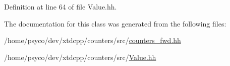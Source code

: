 Definition at line 64 of file Value.\+hh.



The documentation for this class was generated from the following files\+:\begin{DoxyCompactItemize}
\item 
/home/psyco/dev/xtdcpp/counters/src/\hyperlink{counters__fwd_8hh}{counters\+\_\+fwd.\+hh}\item 
/home/psyco/dev/xtdcpp/counters/src/\hyperlink{Value_8hh}{Value.\+hh}\end{DoxyCompactItemize}
